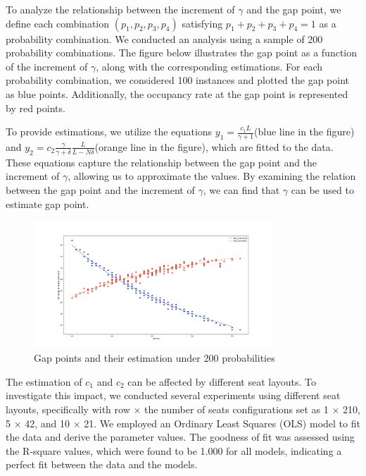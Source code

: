 To analyze the relationship between the increment of $\gamma$ and the gap point, we define each combination $(p_1, p_2, p_3, p_4)$ satisfying $p_1 + p_2 + p_3 + p_4 = 1$ as a probability combination. We conducted an analysis using a sample of 200 probability combinations. The figure below illustrates the gap point as a function of the increment of $\gamma$, along with the corresponding estimations. For each probability combination, we considered 100 instances and plotted the gap point as blue points. Additionally, the occupancy rate at the gap point is represented by red points.

To provide estimations, we utilize the equations $y_1 = \frac{c_1 L}{\gamma +1}$(blue line in the figure) and $y_2 = c_2 \frac{\gamma}{\gamma + \delta} \frac{L}{L-N \delta}$(orange line in the figure), which are fitted to the data. These equations capture the relationship between the gap point and the increment of $\gamma$, allowing us to approximate the values. By examining the relation between the gap point and the increment of $\gamma$, we can find that $\gamma$ can be used to estimate gap point.

\begin{figure}[ht]
  \centering
    \includegraphics[width=0.8\textwidth]{./Figures/gamma_estimation.pdf}
  \caption{Gap points and their estimation under 200 probabilities}
\end{figure}



The estimation of $c_1$ and $c_2$ can be affected by different seat layouts. To investigate this impact, we conducted several experiments using different seat layouts, specifically with row $\times$ the number of seats configurations set as 1 $\times$ 210, 5 $\times$ 42, and 10 $\times$ 21. We employed an Ordinary Least Squares (OLS) model to fit the data and derive the parameter values. The goodness of fit was assessed using the R-square values, which were found to be 1.000 for all models, indicating a perfect fit between the data and the models.

